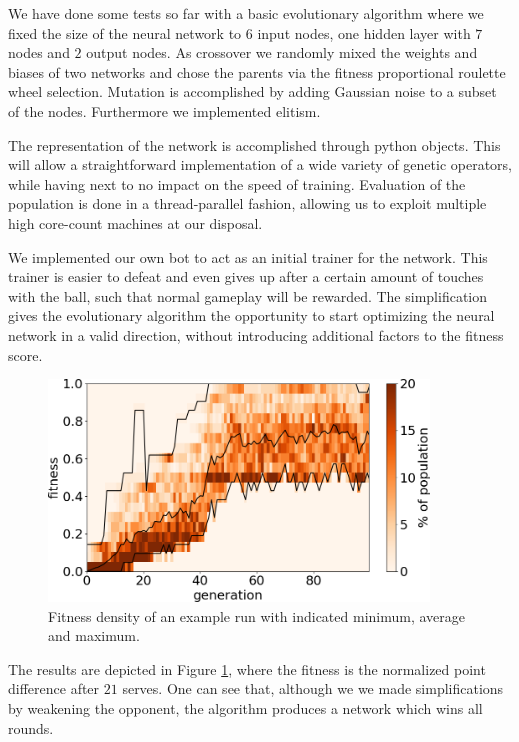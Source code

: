 \documentclass[11pt,a4paper]{scrartcl}
\begin{document}
We have done some tests so far with a basic evolutionary algorithm \cite{github_repo} where we fixed the size of the neural network to $6$ input nodes, one hidden layer with $7$ nodes and $2$ output nodes.
As crossover we randomly mixed the weights and biases of two networks and chose the parents via the fitness proportional roulette wheel selection.
Mutation is accomplished by adding Gaussian noise to a subset of the nodes.
Furthermore we implemented elitism.


The representation of the network is accomplished through python objects. This will allow a straightforward implementation of a wide variety of genetic operators, while having next to no impact on the speed of training.
Evaluation of the population is done in a thread-parallel fashion, allowing us to exploit multiple high core-count machines at our disposal.

We implemented our own bot to act as an initial trainer for the network. This trainer is easier to defeat and even gives up after a certain amount of touches with the ball, such that normal gameplay will be rewarded.
The simplification gives the evolutionary algorithm the opportunity to start optimizing the neural network in a valid direction, without introducing additional factors to the fitness score.

\begin{figure}[H]
\center
\includegraphics[width=0.9\textwidth]{img/fitness.png}
\caption{Fitness density of an example run with indicated minimum, average and maximum.}
\label{fig:train}
\end{figure}

The results are depicted in Figure \ref{fig:train}, where the fitness is the normalized point difference after $21$ serves.
One can see that, although we we made simplifications by weakening the opponent, the algorithm produces a network which wins all rounds.
\end{document}
